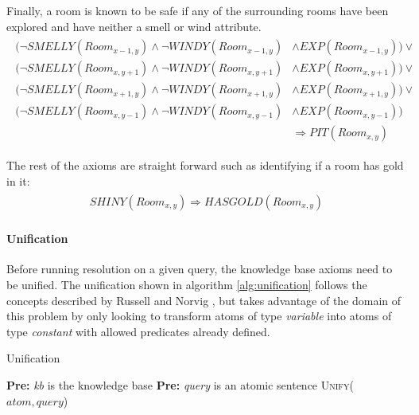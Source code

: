 Finally, a room is known to be safe if any of the surrounding rooms have been explored and have neither a smell or wind attribute.
\begin{align}\label{eq:IsSafe}
\begin{split}
	(\neg SMELLY(Room_{x-1,y}) \land \neg WINDY(Room_{x-1,y}) &\land EXP(Room_{x-1,y})) \lor \\
    (\neg SMELLY(Room_{x,y+1}) \land \neg WINDY(Room_{x,y+1}) &\land EXP(Room_{x,y+1})) \lor \\
    (\neg SMELLY(Room_{x+1,y}) \land \neg WINDY(Room_{x+1,y}) &\land EXP(Room_{x+1,y})) \lor \\
    (\neg SMELLY(Room_{x,y-1}) \land \neg WINDY(Room_{x,y-1}) &\land EXP(Room_{x,y-1})) \\
    &\Rightarrow PIT(Room_{x,y})
\end{split}
\end{align}

The rest of the axioms are straight forward such as identifying if a room has gold in it:
\begin{align}\label{eq:HasGold}
\begin{split}
	SHINY(Room_{x,y}) \Rightarrow HASGOLD(Room_{x,y})
\end{split}
\end{align}

\paragraph{Unification}
Before running resolution on a given query, the knowledge base axioms need to be unified.
The unification shown in algorithm \ref{alg:unification} follows the concepts described by Russell and Norvig \cite{Russell}, but takes advantage of the domain of this problem by only looking to transform atoms of type \textit{variable} into atoms of type \textit{constant} with allowed predicates already defined.
\begin{algorithm}
\caption{Unification}\label{alg:unification}
\begin{algorithmic}[1]
	\State \textbf{Pre:} \textit{kb} is the knowledge base
    \State \textbf{Pre:} \textit{query} is an atomic sentence
            	\State \textsc{Unify}($atom, query$)
            \EndIf
        \EndFor
    \EndFor
\EndProcedure
\end{algorithmic}
\end{algorithm}

